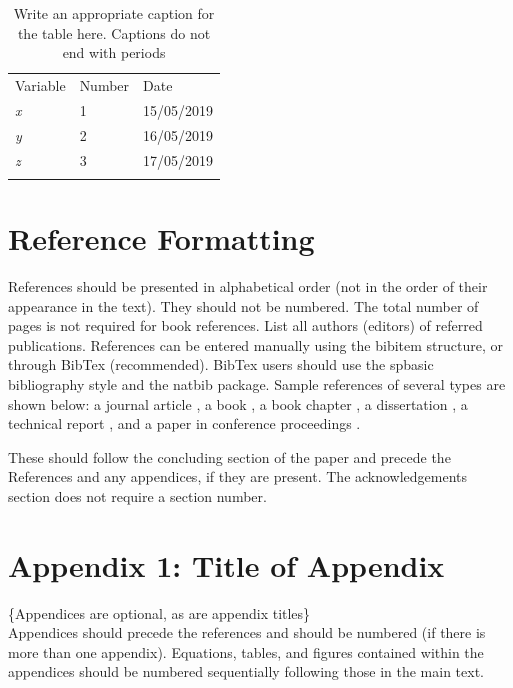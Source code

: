\begin{table}
\caption{Write an appropriate caption for the table here. Captions do not end with periods}
\label{tab:1}       
\begin{tabular}{lll}
\hline\noalign{\smallskip}
Variable & Number & Date  \\
\noalign{\smallskip}\hline\noalign{\smallskip}
\textit{x} & 1 & 15/05/2019 \\
\textit{y} & 2 & 16/05/2019 \\
\textit{z} & 3 & 17/05/2019 \\
\noalign{\smallskip}\hline
\end{tabular}
\end{table}


\section{Reference Formatting}
References should be presented in alphabetical order (not in the order of their appearance in the text). They should not be numbered. The total number of pages is not required for book references. List all authors (editors) of referred publications. References can be entered manually using the bibitem structure, or through BibTex (recommended). BibTex users should use the spbasic bibliography style and the natbib package. Sample references of several types are shown below: a journal article \citep{Mason+1987}, a book \citep{Garratt1994}, a book chapter \citep{Wyngaard2004}, a dissertation \citep{Fedorovich1986,Salesky2014}, a technical report \citep{Newsom++2015}, and a paper in conference proceedings \citep{Kaimal1979,Batchvarova+2003, Marusic++2011}.


\begin{acknowledgements}
These should follow the concluding section of the paper and precede the References and any appendices, if they are present. The acknowledgements section does not require a section number. 
\end{acknowledgements} 

\section*{Appendix 1: Title of Appendix}
\{Appendices are optional, as are appendix titles\}\\
Appendices should precede the references and should be numbered (if there is more than one appendix). Equations, tables, and figures contained within the appendices should be numbered sequentially following those in the main text.





